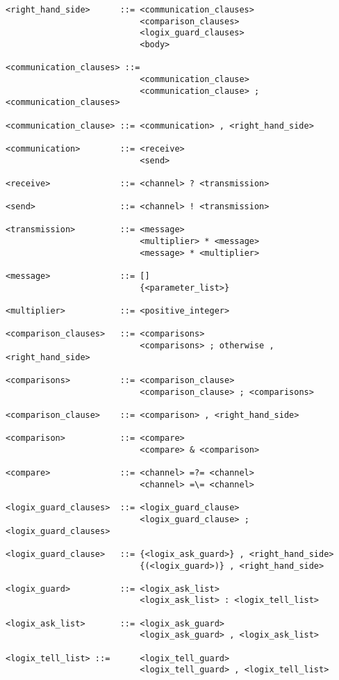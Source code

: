\begin{verbatim}
<right_hand_side>      ::= <communication_clauses>
                           <comparison_clauses>
                           <logix_guard_clauses>
                           <body>

<communication_clauses> ::= 
                           <communication_clause> 
                           <communication_clause> ; <communication_clauses>

<communication_clause> ::= <communication> , <right_hand_side>

<communication>        ::= <receive>
                           <send>

<receive>              ::= <channel> ? <transmission>

<send>                 ::= <channel> ! <transmission>

<transmission>         ::= <message>
                           <multiplier> * <message>
                           <message> * <multiplier>

<message>              ::= []
                           {<parameter_list>}

<multiplier>           ::= <positive_integer>

<comparison_clauses>   ::= <comparisons>
                           <comparisons> ; otherwise , <right_hand_side>

<comparisons>          ::= <comparison_clause>
                           <comparison_clause> ; <comparisons>

<comparison_clause>    ::= <comparison> , <right_hand_side>

<comparison>           ::= <compare>
                           <compare> & <comparison>

<compare>              ::= <channel> =?= <channel>
                           <channel> =\= <channel>

<logix_guard_clauses>  ::= <logix_guard_clause> 
                           <logix_guard_clause> ; <logix_guard_clauses>

<logix_guard_clause>   ::= {<logix_ask_guard>} , <right_hand_side>
                           {(<logix_guard>)} , <right_hand_side>

<logix_guard>          ::= <logix_ask_list>
                           <logix_ask_list> : <logix_tell_list>

<logix_ask_list>       ::= <logix_ask_guard>
                           <logix_ask_guard> , <logix_ask_list>

<logix_tell_list> ::=      <logix_tell_guard>
                           <logix_tell_guard> , <logix_tell_list>


\end{verbatim}

